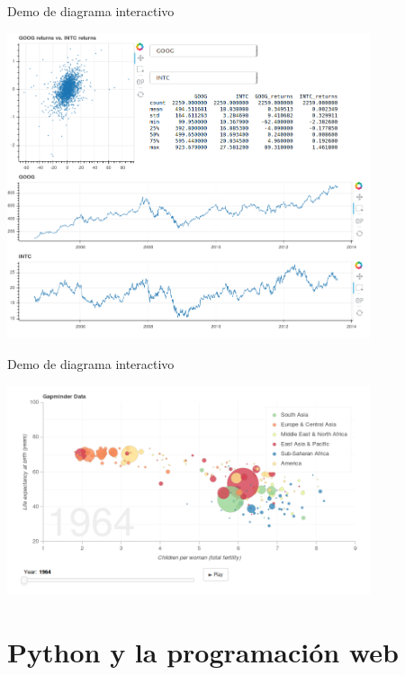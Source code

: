 \documentclass[bigger,unknownkeysallowed]{beamer}
\begin{document}
\begin{frame}[label={sec:org6e0bd8e}]{Demo de diagrama interactivo}
\begin{center}
\href{https://demo.bokehplots.com/apps/stocks}{\includegraphics[width=0.8\textwidth]{./bokeh_demo1.png}}
\end{center}
\end{frame}

\begin{frame}[label={sec:org070532c}]{Demo de diagrama interactivo}
\begin{center}
\href{https://demo.bokehplots.com/apps/gapminder}{\includegraphics[width=0.8\textwidth]{./bokeh_demo2.png}}
\end{center}
\end{frame}





\section{Python y la programación web}
\label{sec:org8c1446d}
\end{document}
